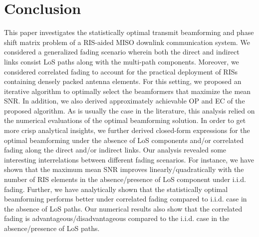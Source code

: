 \documentclass[journal,draftclsnofoot,onecolumn,12pt]{IEEEtran}
\begin{document}
\section{Conclusion}\vspace{-.2cm}
This paper investigates the statistically optimal transmit beamforming and phase shift matrix problem of a RIS-aided MISO  downlink communication system. We considered a generalized fading scenario wherein  both the direct and indirect links consist LoS paths  along with the multi-path components. Moreover, we  considered correlated fading to account for the practical deployment of RISs containing densely packed antenna elements. 
For this setting, we proposed an iterative algorithm  to optimally select the beamformers that  maximize the  mean SNR. In addition, we also derived approximately achievable OP and EC of the proposed algorithm. 
As is usually the case in the literature, this analysis relied on the numerical evaluations of the optimal beamforming solution. In order to get more crisp analytical insights, we further derived closed-form expressions for the optimal beamforming under the absence of LoS components and/or correlated fading along the direct and/or indirect links.     
Our analysis revealed some interesting interrelations between different fading scenarios.
For instance, we have shown that the maximum mean SNR improves linearly/quadratically with the number of RIS elements in the absence/presence of LoS component under {\rm i.i.d.} fading. 
Further, we have analytically shown that the statistically optimal beamforming performs better under correlated fading compared to {\rm i.i.d.} case in the absence of LoS paths. 
Our numerical results also show that the correlated fading is advantageous/disadvantageous compared to the  {\rm i.i.d.} case in the absence/presence of LoS paths. 
\vspace{-1cm}\appendix\vspace{-.5cm}
\end{document}
